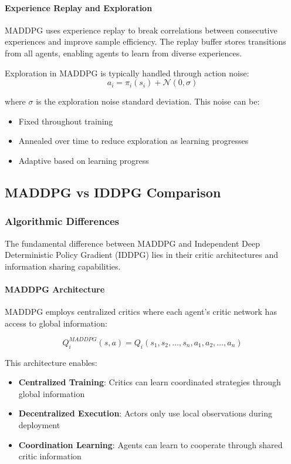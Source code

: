 \documentclass[conference]{IEEEtran}
\begin{document}
{{\paragraph{Experience Replay and Exploration}

MADDPG uses experience replay to break correlations between consecutive experiences and improve sample efficiency. The replay buffer stores transitions from all agents, enabling agents to learn from diverse experiences.

Exploration in MADDPG is typically handled through action noise:
\begin{equation}
a_i = \pi_i(s_i) + \mathcal{N}(0, \sigma)
\end{equation}

where $\sigma$ is the exploration noise standard deviation. This noise can be:
\begin{itemize}
    \item Fixed throughout training
    \item Annealed over time to reduce exploration as learning progresses
    \item Adaptive based on learning progress
\end{itemize}

\subsection{MADDPG vs IDDPG Comparison}

\subsubsection{Algorithmic Differences}

The fundamental difference between MADDPG and Independent Deep Deterministic Policy Gradient (IDDPG) lies in their critic architectures and information sharing capabilities.

\paragraph{MADDPG Architecture}

MADDPG employs centralized critics where each agent's critic network has access to global information:

\begin{equation}
Q_i^{MADDPG}(s, a) = Q_i(s_1, s_2, \ldots, s_n, a_1, a_2, \ldots, a_n)
\end{equation}

This architecture enables:
\begin{itemize}
    \item \textbf{Centralized Training}: Critics can learn coordinated strategies through global information
    \item \textbf{Decentralized Execution}: Actors only use local observations during deployment
    \item \textbf{Coordination Learning}: Agents can learn to cooperate through shared critic information
\end{itemize}

}}
\end{document}
